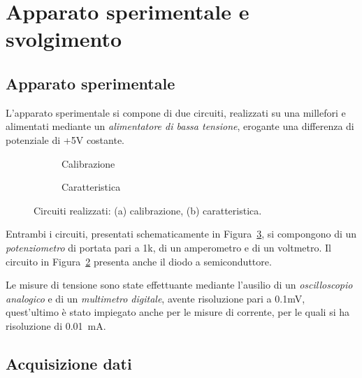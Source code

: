 \documentclass[@MAIN@]{subfiles}
\begin{document}
    \section{Apparato sperimentale e svolgimento} \label{sec:acquisizione}

    \subsection{Apparato sperimentale}\label{subsec:apparato-sperimentale}
    L'apparato sperimentale si compone di due circuiti, realizzati su una millefori
    e alimentati mediante un \textit{alimentatore di bassa tensione},
    erogante una differenza di potenziale di +5V costante.


    \begin{figure}[ht]
        \centering
        \begin{subfigure}[b]{0.4\textwidth}
            \centering
            
            \caption{Calibrazione}
            \label{fig:circuito-calibrazione}
        \end{subfigure}
        \hfill
        \begin{subfigure}[b]{0.55\textwidth}
            \centering
            
            \caption{Caratteristica}
            \label{fig:circuito-caratteristica}
        \end{subfigure}
        \caption{Circuiti realizzati: (a) calibrazione, (b) caratteristica.}
        \label{fig:figura_circuiti}
    \end{figure}

    \newpage
    Entrambi i circuiti, presentati schematicamente in Figura~\ref{fig:figura_circuiti}, si compongono di
    un \textit{potenziometro} di portata pari a 1k\textohm, di un amperometro e
    di un voltmetro.
    Il circuito in Figura~\ref{fig:circuito-caratteristica} presenta anche il diodo
    a semiconduttore.

    Le misure di tensione sono state effettuante mediante l'ausilio di un
    \textit{oscilloscopio analogico} e di un \textit{multimetro digitale}, avente
    risoluzione pari a 0.1mV, quest'ultimo è stato impiegato anche per le misure
    di corrente, per le quali si ha risoluzione di 0.01~mA.
    \vspace{0.2cm}

    \subsection{Acquisizione dati}\label{subsec:acquisizione-dati}
\end{document}
